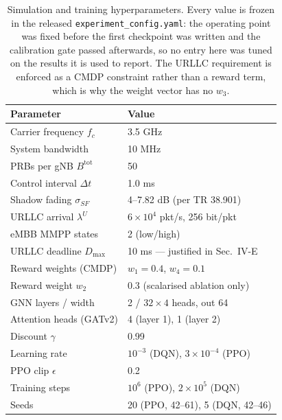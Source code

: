 \documentclass[journal]{IEEEtran}
\begin{document}
\begin{table}[!t]
\renewcommand{\arraystretch}{1.2}
\caption{Simulation and training hyperparameters. Every value is frozen
in the released \texttt{experiment\_config.yaml}: the operating point
was fixed before the first checkpoint was written and the calibration
gate passed afterwards, so no entry here was tuned on the results it is
used to report. The URLLC requirement is enforced as a CMDP constraint
rather than a reward term, which is why the weight vector has no $w_3$.}
\label{tab:hyper}
\centering
\footnotesize
\begin{tabular}{@{}ll@{}}
\hline
\textbf{Parameter} & \textbf{Value} \\
\hline
Carrier frequency $f_c$        & 3.5 GHz \\
System bandwidth               & 10 MHz \\
PRBs per gNB $B^{\mathrm{tot}}$& 50 \\
Control interval $\Delta t$    & 1.0 ms \\
Shadow fading $\sigma_{SF}$    & 4--7.82 dB (per TR 38.901) \\
URLLC arrival $\lambda^{U}$    & $6\times10^{4}$ pkt/s, 256 bit/pkt \\
eMBB MMPP states               & 2 (low/high) \\
URLLC deadline $D_{\max}$      & 10 ms --- justified in Sec.~IV-E \\
Reward weights (CMDP)          & $w_1 = 0.4$, $w_4 = 0.1$ \\
Reward weight $w_2$            & 0.3 (scalarised ablation only) \\
GNN layers / width             & 2 / $32\times4$ heads, out 64 \\
Attention heads (GATv2)        & 4 (layer 1), 1 (layer 2) \\
Discount $\gamma$              & 0.99 \\
Learning rate                  & $10^{-3}$ (DQN), $3\times10^{-4}$ (PPO) \\
PPO clip $\epsilon$            & 0.2 \\
Training steps                 & $10^{6}$ (PPO), $2\times10^{5}$ (DQN) \\
Seeds                          & 20 (PPO, 42--61), 5 (DQN, 42--46) \\
\hline
\end{tabular}
\end{table}

\end{document}

